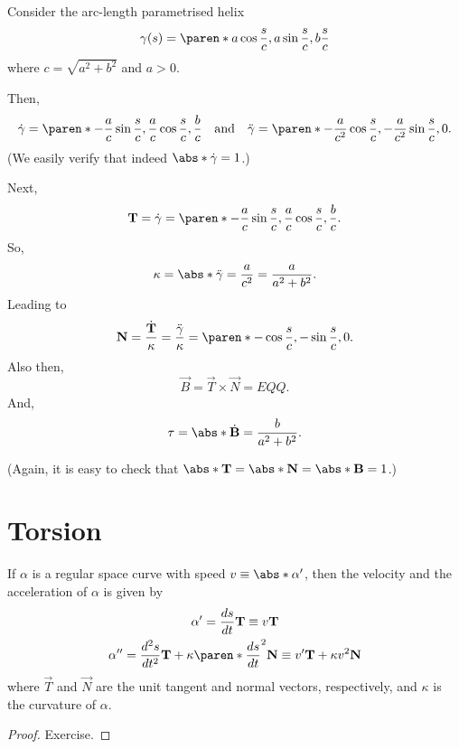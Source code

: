 \documentclass[11pt]{penrose}
\newcommand{\vT}{\vec{T}}
\newcommand{\vN}{\vec{N}}
\newcommand{\vB}{\vec{B}}
\newcommand{\missing}[1]{{\color{red}#1}}
\begin{document}
\begin{negg}
    Consider the arc-length parametrised helix
    \begin{equation}
        \gamma(s) = \paren*{ a \cos\frac{s}{c}, a\sin\frac{s}{c}, b\frac{s}{c} }
    \end{equation}
    where $c = \sqrt{a^2 + b^2}$ and $a > 0$.

    Then,
    \begin{equation}
        \dot{\gamma} = \paren*{ -\frac{a}{c} \sin\frac{s}{c}, \frac{a}{c} \cos\frac{s}{c}, \frac{b}{c} }
        \quad\text{and}\quad
        \ddot{\gamma} = \paren*{ -\frac{a}{c^2} \cos\frac{s}{c}, -\frac{a}{c^2} \sin\frac{s}{c}, 0 }.
    \end{equation}
    (We easily verify that indeed $\abs*{\dot{\gamma}} = 1$.)

    Next,
    \begin{equation}
        \vT = \dot{\gamma} = \paren*{ -\frac{a}{c} \sin\frac{s}{c}, \frac{a}{c} \cos\frac{s}{c}, \frac{b}{c} }.
    \end{equation}
    So,
    \begin{equation}
        \kappa = \abs*{\ddot{\gamma}} = \frac{a}{c^2} = \frac{a}{a^2 + b^2}.
    \end{equation}
    Leading to
    \begin{equation}
        \vN = \frac{\dot{\vT}}{\kappa} = \frac{\ddot{\gamma}}{\kappa} = \paren*{ -\cos\frac{s}{c}, -\sin\frac{s}{c}, 0 }.
    \end{equation}
    Also then,
    \missing{
    \begin{equation}
        \vB = \vT \times \vN = EQQ.
    \end{equation}
    }
    And,
    \begin{equation}
        \tau = \abs*{\dot{\vB}} = \frac{b}{a^2 + b^2}.
    \end{equation}
    
    (Again, it is easy to check that $\abs*{\vT} = \abs*{\vN} = \abs*{\vB} = 1$.)
\end{negg}

\section{Torsion}

\begin{nlemma}
    If $\alpha$ is a regular space curve with speed $v \equiv \abs*{\alpha'}$, then the velocity and the acceleration of $\alpha$ is given by
    \begin{gather}
        \alpha' = \frac{ds}{dt} \vT \equiv v \vT\\
        \alpha'' = \frac{d^2 s}{dt^2} \vT + \kappa \paren*{\frac{ds}{dt}}^2 \vN \equiv v' \vT + \kappa v^2 \vN
    \end{gather}
    where $\vT$ and $\vN$ are the unit tangent and normal vectors, respectively, and $\kappa$ is the curvature of $\alpha$.
\end{nlemma}
\missing{
\begin{proof}
    Exercise.
\end{proof}
}
\end{document}
